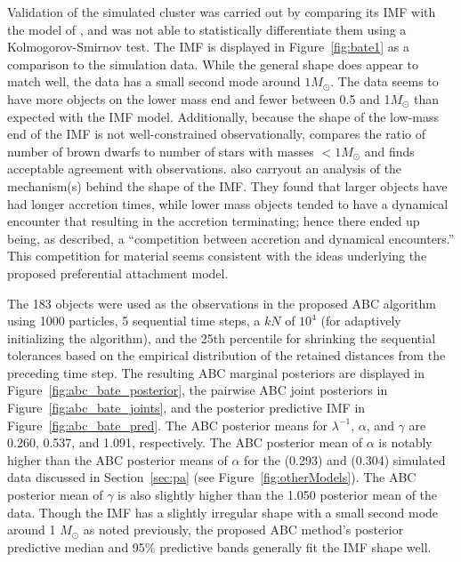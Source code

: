 \documentclass[12pt]{article}
\newcommand{\Msun}{M_{\odot}}
\begin{document}
Validation of the simulated cluster was carried out by comparing its IMF with the model of \cite{chabrier2005}, and was not able to statistically differentiate them using a Kolmogorov-Smirnov test.  The \cite{chabrier2005} IMF is displayed in Figure~\ref{fig:bate1} as a comparison to the simulation data.  While the general shape does appear to match well, the \cite{Bate2012} data has a small second mode around $1\Msun$.  The \cite{Bate2012} data seems to have more objects on the lower mass end and fewer between 0.5 and 1$\Msun$ than expected with the \cite{chabrier2005} IMF model.
%
Additionally, because the shape of the low-mass end of the IMF is not well-constrained observationally,  \cite{Bate2012} compares the ratio of number of brown dwarfs to number of stars with masses $<1\Msun$ and finds acceptable agreement with observations. 
%
\cite{Bate2012} also carryout an analysis of the mechanism(s) behind the shape of the IMF.  
They found that larger objects have had longer accretion times, while lower mass objects tended to have a dynamical encounter that resulting in the accretion terminating; hence there ended up being, as \cite{Bate2012} described, a ``competition between accretion and dynamical encounters.''  This competition for material seems consistent with the ideas underlying the proposed preferential attachment model.


The 183 objects were used as the observations in the proposed ABC algorithm using 1000 particles, 5 sequential time steps, a $kN$ of $10^4$ (for adaptively initializing the algorithm), and the 25th percentile for shrinking the sequential tolerances based on the empirical distribution of the retained distances from the preceding time step.  The resulting ABC marginal posteriors are displayed in Figure~\ref{fig:abc_bate_posterior}, the pairwise ABC joint posteriors in Figure~\ref{fig:abc_bate_joints}, and the posterior predictive IMF in Figure~\ref{fig:abc_bate_pred}.
The ABC posterior means for $\lambda^{-1}$, $\alpha$, and $\gamma$ are 0.260, 0.537, and 1.091, respectively.  The ABC posterior mean of $\alpha$ is notably higher than the ABC posterior means of $\alpha$ for the \cite{kroupa2001} (0.293) and \cite{Chabrier:2003om, Chabrier:2003oq} (0.304) simulated data discussed in Section~\ref{sec:pa} (see Figure~\ref{fig:otherModels}).  The ABC posterior mean of $\gamma$ is also slightly higher than the 1.050 posterior mean of the \cite{Chabrier:2003om, Chabrier:2003oq} data.
%
Though the IMF has a slightly irregular shape with a small second mode around 1 $\Msun$ as noted previously, the proposed ABC method's  posterior predictive median and 
95\% predictive bands generally fit the IMF shape well.
\end{document}
